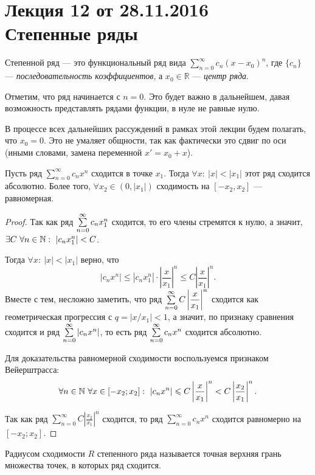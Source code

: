 \documentclass[a4paper, 12pt]{article}
\begin{document}
\pagestyle{fancy}
\section{Лекция 12 от 28.11.2016 \\ Степенные ряды}
\begin{Def}
	Степенной ряд --- это функциональный ряд вида $\sum\limits_{n = 0}^{\infty}c_n (x-x_0)^n$, где $\{c_n\}$ --- \textit{последовательность коэффициентов}, а $x_0 \in \mathbb{R}$ ---  \textit{центр ряда}.
\end{Def}

Отметим, что ряд начинается с $n = 0$. Это будет важно в дальнейшем, давая возможность представлять рядами функции, в нуле не равные нулю.

В процессе всех дальнейших рассуждений в рамках этой лекции будем полагать, что $x_0 = 0$. Это не умаляет общности, так как фактически это сдвиг по оси (иными словами, замена переменной $x' = x_0+x$).

\begin{Theorem} [Абеля I]
	Пусть ряд $\sum\limits_{n = 0}^{\infty}c_n x^n$ сходится в точке $x_1$. Тогда $\forall x:\ |x| < |x_1|$ этот ряд сходится абсолютно. Более того, $\forall x_2 \in (0, |x_1|)$ сходимость на $[-x_2, x_2]$ --- равномерная.
\end{Theorem}
\begin{proof}
	Так как ряд $\sum\limits_{n=0}^{\infty} c_nx_1^n$ сходится, то его члены стремятся к нулю, а значит, $\exists C\ \forall n \in \mathbb{N}:\ |c_nx_1^n| < C$. 
	
	Тогда $\forall x:\ |x| < |x_1|$ верно, что 
	$$
	|c_nx^n| \leq |c_nx_1^n| \cdot \left| \dfrac{x}{x_1} \right|^n \leq C \left| \dfrac{x}{x_1} \right|^n.
	$$
	Вместе с тем, несложно заметить, что ряд $\sum\limits_{n=0}^{\infty} C \left|\dfrac{x}{x_1}\right|^n$ сходится как геометрическая прогрессия с $q = |x/x_1| < 1$, а значит, по признаку сравнения сходится и ряд $\sum\limits_{n=0}^{\infty} |c_nx^n|$, то есть ряд $\sum\limits_{n=0}^{\infty} c_nx^n$ сходится абсолютно.
	
	Для доказательства равномерной сходимости воспользуемся признаком Вейерштрасса:
	$$
	\forall n \in \mathbb{N}\ \forall x \in [-x_2; x_2]:\ |c_nx^n| \leqslant C\left|\frac{x}{x_1} \right|^n < C\left|\frac{x_2}{x_1}\right|^n.
	$$
	
	Так как ряд $\sum\limits_{n=0}^{\infty} C\left|\frac{x_2}{x_1} \right|^n$ сходится, то ряд $\sum\limits_{n = 0}^{\infty}c_n x^n$ сходится равномерно на $[-x_2; x_2]$.
\end{proof}


\begin{Def}
	Радиусом сходимости $R$ степенного ряда  называется точная верхняя грань множества точек, в которых ряд сходится.
\end{Def}
\end{document}
